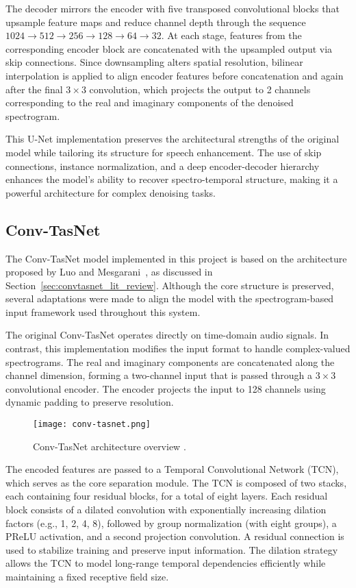 The decoder mirrors the encoder with five transposed convolutional blocks that upsample feature maps and reduce channel depth through the sequence \(1024 \rightarrow 512 \rightarrow 256 \rightarrow 128 \rightarrow 64 \rightarrow 32\). At each stage, features from the corresponding encoder block are concatenated with the upsampled output via skip connections. Since downsampling alters spatial resolution, bilinear interpolation is applied to align encoder features before concatenation and again after the final \(3 \times 3\) convolution, which projects the output to 2 channels corresponding to the real and imaginary components of the denoised spectrogram.

This U-Net implementation preserves the architectural strengths of the original model while tailoring its structure for speech enhancement. The use of skip connections, instance normalization, and a deep encoder-decoder hierarchy enhances the model’s ability to recover spectro-temporal structure, making it a powerful architecture for complex denoising tasks.

\subsection{Conv-TasNet}
\label{sec:convtasnet}

The Conv-TasNet model implemented in this project is based on the architecture proposed by Luo and Mesgarani~\cite{luo2019conv}, as discussed in Section~\ref{sec:convtasnet_lit_review}. Although the core structure is preserved, several adaptations were made to align the model with the spectrogram-based input framework used throughout this system.

The original Conv-TasNet operates directly on time-domain audio signals. In contrast, this implementation modifies the input format to handle complex-valued spectrograms. The real and imaginary components are concatenated along the channel dimension, forming a two-channel input that is passed through a \(3 \times 3\) convolutional encoder. The encoder projects the input to 128 channels using dynamic padding to preserve resolution.

\begin{figure}[h]
    \centering
    \texttt{[image: conv-tasnet.png]}
    \caption{\label{fig:convtasnet}Conv-TasNet architecture overview \cite{luo2019conv}.}
\end{figure}

The encoded features are passed to a Temporal Convolutional Network (TCN), which serves as the core separation module. The TCN is composed of two stacks, each containing four residual blocks, for a total of eight layers. Each residual block consists of a dilated convolution with exponentially increasing dilation factors (e.g., 1, 2, 4, 8), followed by group normalization (with eight groups), a PReLU activation, and a second projection convolution. A residual connection is used to stabilize training and preserve input information. The dilation strategy allows the TCN to model long-range temporal dependencies efficiently while maintaining a fixed receptive field size.

